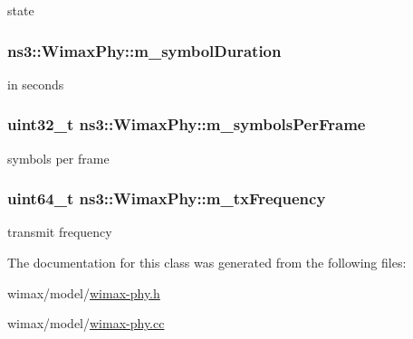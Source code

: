 state 

\subsubsection[{\texorpdfstring{m\+\_\+symbol\+Duration}{m_symbolDuration}}]{ ns3\+::\+Wimax\+Phy\+::m\+\_\+symbol\+Duration\hspace{0.3cm}{\ttfamily [private]}}\hypertarget{classns3_1_1WimaxPhy_aac5780864b59d5c6fab2d99ec86273e6}{}\label{classns3_1_1WimaxPhy_aac5780864b59d5c6fab2d99ec86273e6}


in seconds 

\subsubsection[{\texorpdfstring{m\+\_\+symbols\+Per\+Frame}{m_symbolsPerFrame}}]{\setlength{\rightskip}{0pt plus 5cm}uint32\+\_\+t ns3\+::\+Wimax\+Phy\+::m\+\_\+symbols\+Per\+Frame\hspace{0.3cm}{\ttfamily [private]}}\hypertarget{classns3_1_1WimaxPhy_a48129f266177bc3f07781364aefb2e34}{}\label{classns3_1_1WimaxPhy_a48129f266177bc3f07781364aefb2e34}


symbols per frame 

\subsubsection[{\texorpdfstring{m\+\_\+tx\+Frequency}{m_txFrequency}}]{\setlength{\rightskip}{0pt plus 5cm}uint64\+\_\+t ns3\+::\+Wimax\+Phy\+::m\+\_\+tx\+Frequency\hspace{0.3cm}{\ttfamily [private]}}\hypertarget{classns3_1_1WimaxPhy_a1f626a81161a77b01508a30e50d4c06b}{}\label{classns3_1_1WimaxPhy_a1f626a81161a77b01508a30e50d4c06b}


transmit frequency 



The documentation for this class was generated from the following files\+:\begin{DoxyCompactItemize}
\item 
wimax/model/\hyperlink{wimax-phy_8h}{wimax-\/phy.\+h}\item 
wimax/model/\hyperlink{wimax-phy_8cc}{wimax-\/phy.\+cc}\end{DoxyCompactItemize}
